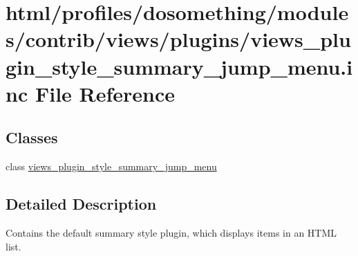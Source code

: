 \hypertarget{views__plugin__style__summary__jump__menu_8inc}{
\section{html/profiles/dosomething/modules/contrib/views/plugins/views\_\-plugin\_\-style\_\-summary\_\-jump\_\-menu.inc File Reference}
\label{views__plugin__style__summary__jump__menu_8inc}
}
\subsection*{Classes}
\begin{DoxyCompactItemize}
\item 
class \hyperlink{classviews__plugin__style__summary__jump__menu}{views\_\-plugin\_\-style\_\-summary\_\-jump\_\-menu}
\end{DoxyCompactItemize}


\subsection{Detailed Description}
Contains the default summary style plugin, which displays items in an HTML list. 